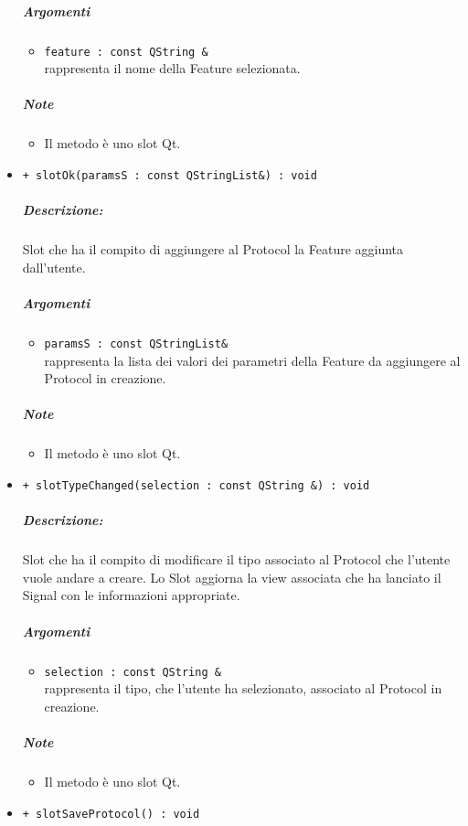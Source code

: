 \begin{itemize}
			\color{black}
			\subparagraph{Argomenti}
			\begin{itemize}
				\item \color{RoyalPurple} \verb!feature : const QString &!\\				
\color{black} rappresenta il nome della Feature\g{} selezionata.
			\end{itemize}
			\subparagraph{Note}
			\begin{itemize}
				\item Il metodo è uno slot\g{} Qt\g{}.
			\end{itemize}
			\item \color{blue} \verb!+ slotOk(paramsS : const QStringList&) : void!
			\color{black}
			\subparagraph{Descrizione:} Slot\g{} che ha il compito di aggiungere al Protocol\g{} la Feature\g{} aggiunta dall'utente.
			\color{black}
			\subparagraph{Argomenti}
			\begin{itemize}
				\item \color{RoyalPurple} \verb!paramsS : const QStringList&!\\				
\color{black} rappresenta la lista dei valori dei parametri della Feature\g{} da aggiungere al Protocol\g{} in creazione.
			\end{itemize}
			\subparagraph{Note}
			\begin{itemize}
				\item Il metodo è uno slot\g{} Qt\g{}.
			\end{itemize}
			\item \color{blue} \verb!+ slotTypeChanged(selection : const QString &) : void!
			\color{black}
			\subparagraph{Descrizione:} Slot\g{} che ha il compito di modificare il tipo associato al Protocol\g{} che l'utente vuole andare  a creare. Lo Slot\g{} aggiorna la view associata che ha lanciato il Signal\g{} con le informazioni appropriate.
			\color{black}
			\subparagraph{Argomenti}
			\begin{itemize}
				\item \color{RoyalPurple} \verb!selection : const QString &!\\				
\color{black} rappresenta il tipo, che l'utente ha selezionato, associato al Protocol\g{} in creazione.
			\end{itemize}
			\subparagraph{Note}
			\begin{itemize}
				\item Il metodo è uno slot\g{} Qt\g{}.
			\end{itemize}
			\item \color{blue} \verb!+ slotSaveProtocol() : void!

\end{itemize}
